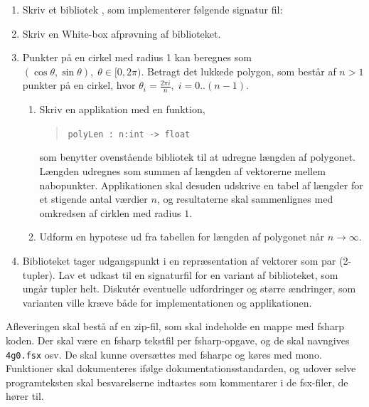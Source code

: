 \documentclass[a4paper,12pt]{article}
\begin{document}
\begin{enumerate}[label=4g.\arabic*,start=0]
\item Skriv et bibliotek , som implementerer følgende signatur fil:
\item Skriv en White-box afprøvning af biblioteket.
\item Punkter på en cirkel med radius 1 kan beregnes som $(\cos \theta, \sin \theta), \;\theta\in [0,2\pi)$. Betragt det lukkede polygon, som består af $n>1$ punkter på en cirkel, hvor $\theta_i = \frac{2\pi i}{n},\; i = 0..(n-1)$. 
  \begin{enumerate}
  \item Skriv en applikation med en funktion,
  \begin{quote}
    \lstinline{polyLen : n:int -> float}
  \end{quote}
som benytter ovenstående bibliotek til at udregne længden af polygonet. Længden udregnes som summen af længden af vektorerne mellem nabopunkter. Applikationen skal desuden udskrive en tabel af længder for et stigende antal værdier $n$, og resultaterne skal sammenlignes med omkredsen af cirklen med radius $1$. 
\item Udform en hypotese ud fra tabellen for længden af polygonet når $n\rightarrow\infty$.
  \end{enumerate}
\item Biblioteket  tager udgangspunkt i en repræsentation af vektorer som par (2-tupler). Lav et udkast til en signaturfil for en variant af biblioteket, som ungår tupler helt. Diskut\'{e}r eventuelle udfordringer og større ændringer, som varianten ville kræve både for implementationen og applikationen.
\end{enumerate}
Afleveringen skal bestå af en zip-fil, som skal indeholde en mappe med fsharp koden. Der skal være en fsharp tekstfil per fsharp-opgave, og de skal navngives \verb|4g0.fsx| osv. De skal kunne oversættes med fsharpc og køres med mono. Funktioner skal dokumenteres ifølge dokumentationsstandarden, og udover selve programteksten skal besvarelserne indtastes som kommentarer i de fsx-filer, de hører til.
\end{document}
